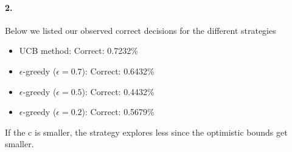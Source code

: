 \paragraph{2.}
Below we listed our observed correct decisions for the different strategies
\begin{itemize}
    \item UCB method: Correct: 0.7232\%
    \item $\epsilon$-greedy ($\epsilon=0.7$): Correct: 0.6432\%
    \item $\epsilon$-greedy ($\epsilon=0.5$): Correct: 0.4432\%
    \item $\epsilon$-greedy ($\epsilon=0.2$): Correct: 0.5679\%
\end{itemize}
If the c is smaller, the strategy explores less since the optimistic bounds
get smaller.
